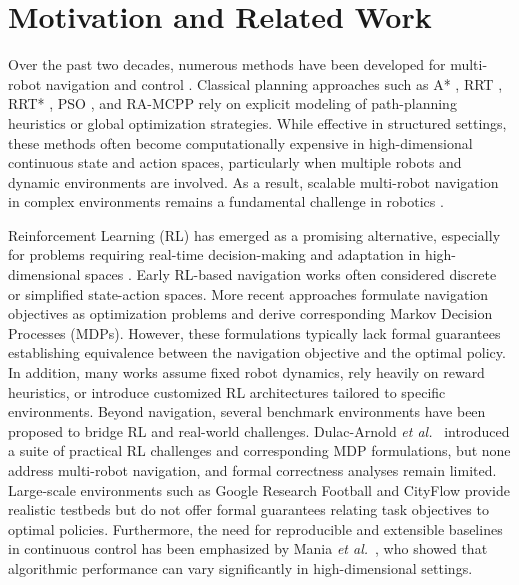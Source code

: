 \documentclass{article}
\begin{document}
\section{Motivation and Related Work}
\label{sec:related}

Over the past two decades, numerous methods have been developed for multi-robot navigation and control \cite{nafis2021, sam2005, mickey2021}. Classical planning approaches such as A* \cite{goto2003}, RRT \cite{rodriguez2006rrt}, RRT* \cite{karaman2011rrts}, PSO \cite{nafis2021}, and RA-MCPP \cite{mickey2021} rely on explicit modeling of path-planning heuristics or global optimization strategies. While effective in structured settings, these methods often become computationally expensive in high-dimensional continuous state and action spaces, particularly when multiple robots and dynamic environments are involved. As a result, scalable multi-robot navigation in complex environments remains a fundamental challenge in robotics \cite{Sunderhauf2018ijrr, ibarz2021ijrr, zhang2023multi, cai2022multi, osooli2024multi}.

Reinforcement Learning (RL) has emerged as a promising alternative, especially for problems requiring real-time decision-making and adaptation in high-dimensional spaces \cite{kober2014, chen2017icra, everett2018iros, bae2019as, tang2025, dulacArnold2021, ibarz2021ijrr}. Early RL-based navigation works \cite{kober2014, bae2019as} often considered discrete or simplified state-action spaces. More recent approaches \cite{chen2017icra, everett2018iros, long2017iral, fan2020ijrr, han2022iral} formulate navigation objectives as optimization problems and derive corresponding Markov Decision Processes (MDPs). However, these formulations typically lack formal guarantees establishing equivalence between the navigation objective and the optimal policy. In addition, many works assume fixed robot dynamics, rely heavily on reward heuristics, or introduce customized RL architectures tailored to specific environments. Beyond navigation, several benchmark environments have been proposed to bridge RL and real-world challenges. Dulac-Arnold \textit{et al.}~\cite{dulacArnold2021} introduced a suite of practical RL challenges and corresponding MDP formulations, but none address multi-robot navigation, and formal correctness analyses remain limited. Large-scale environments such as Google Research Football \cite{kurach2020google} and CityFlow \cite{zhang2019cityflow} provide realistic testbeds but do not offer formal guarantees relating task objectives to optimal policies. Furthermore, the need for reproducible and extensible baselines in continuous control has been emphasized by Mania \textit{et al.}~\cite{mania2018ars}, who showed that algorithmic performance can vary significantly in high-dimensional settings.
\end{document}
